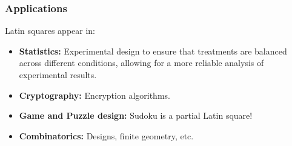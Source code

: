\documentclass{beamer}
\begin{document}







\begin{frame}
\frametitle{Applications}
Latin squares appear in:
\begin{itemize}
  \item \textbf{Statistics:} Experimental design to ensure that treatments are balanced across different conditions, allowing for a more reliable analysis of experimental results.
  \item \textbf{Cryptography:} Encryption algorithms.
  \item \textbf{Game and Puzzle design:} Sudoku is a partial Latin square!
  \item \textbf{Combinatorics:} Designs, finite geometry, etc.
\end{itemize}
\end{frame}
\end{document}
